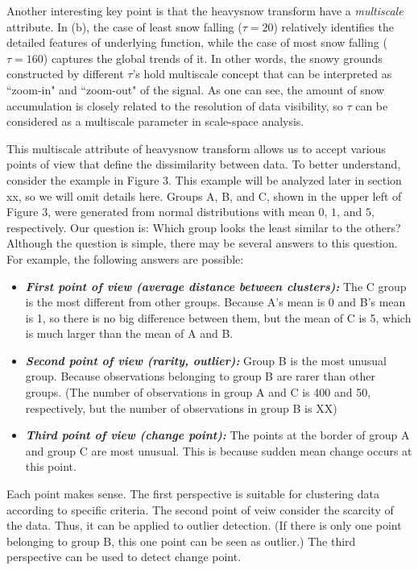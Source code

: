 \documentclass[preprint, review, 12pt]{article}
\theoremstyle{definition}
\theoremstyle{remark}
\begin{document}
\iffalse
Another interesting key point is that the heavysnow transform have a \emph{multiscale} attribute. In (b), the case of least snow falling ($\tau=20$) relatively identifies the detailed features of underlying function, while the case of most snow falling ($\tau=160$) captures the global trends of it. In other words, the snowy grounds constructed by different $\tau$'s hold multiscale concept that can be interpreted as ``zoom-in" and ``zoom-out" of the signal. As one can see, the amount of snow accumulation is closely related to the resolution of data visibility, so $\tau$ can be considered as a multiscale parameter in scale-space analysis.

This multiscale attribute of heavysnow transform allows us to accept various points of view that define the dissimilarity between data. To better understand, consider the example in Figure 3. This example will be analyzed later in section xx, so we will omit details here. Groups A, B, and C, shown in the upper left of Figure 3, were generated from normal distributions with mean $0$, $1$, and $5$, respectively. Our question is:  
 Which group looks the least similar to the others? Although the question is simple, there may be several answers to this question. For example, the following answers are possible:
\begin{itemize}
\item \textbf{\it First point of view (average distance between clusters):} The C group is the most different from other groups. Because A's mean is 0 and B's mean is 1, so there is no big difference between them, but the mean of C is 5, which is much larger than the mean of A and B.
\item \textbf{\it Second point of view (rarity, outlier):} Group B is the most unusual group. Because observations belonging to group B are rarer than other groups. (The number of observations in group A and C is 400 and 50, respectively, but the number of observations in group B is XX)
\item \textbf{\it Third point of view (change point):} The points at the border of group A and group C are most unusual. This is because  sudden mean change occurs at this point.
\end{itemize}
Each point makes sense. The first perspective is suitable for clustering data according to specific criteria. The second point of veiw consider the scarcity of the data. Thus, it can be applied to outlier detection. (If there is only one point belonging to group B, this one point can be seen as outlier.) The third perspective can be used to detect change point. 
\end{document}
